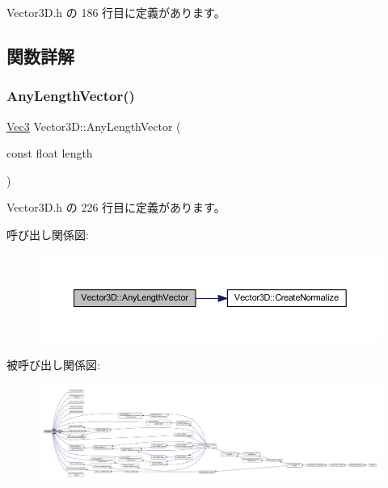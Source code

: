  Vector3\+D.\+h の 186 行目に定義があります。



\subsection{関数詳解}
\mbox{\label{class_vector3_d_a030384bdfe25863cd4be77fa73052cf1}} 
\subsubsection{\texorpdfstring{Any\+Length\+Vector()}{AnyLengthVector()}}
{\footnotesize\ttfamily \mbox{\hyperlink{_vector3_d_8h_ab16f59e4393f29a01ec8b9bbbabbe65d}{Vec3}} Vector3\+D\+::\+Any\+Length\+Vector (\begin{DoxyParamCaption}\item[{const float}]{length }\end{DoxyParamCaption})\hspace{0.3cm}{\ttfamily [inline]}}



 Vector3\+D.\+h の 226 行目に定義があります。

呼び出し関係図\+:\nopagebreak
\begin{figure}[H]
\begin{center}
\leavevmode
\includegraphics[width=350pt]{class_vector3_d_a030384bdfe25863cd4be77fa73052cf1_cgraph}
\end{center}
\end{figure}
被呼び出し関係図\+:
\nopagebreak
\begin{figure}[H]
\begin{center}
\leavevmode
\includegraphics[width=350pt]{class_vector3_d_a030384bdfe25863cd4be77fa73052cf1_icgraph}
\end{center}
\end{figure}
\mbox{\label{class_vector3_d_ae55e42c07bdfcc6c11bcbc6bf5e27808}} 
